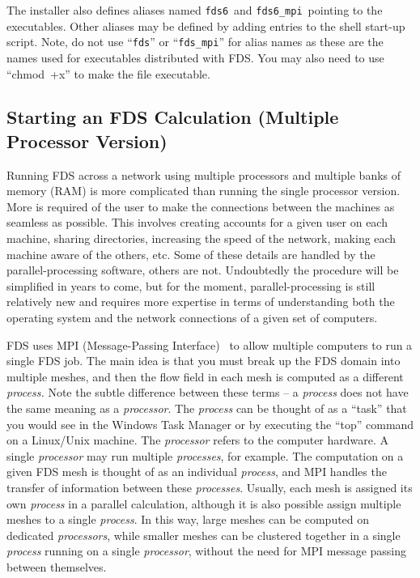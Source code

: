 \documentclass[11pt]{book}
\newcommand{\ct}{\tt\small}
\begin{document}
The installer also defines aliases named {\ct fds6}\ and {\ct fds6\_mpi}\
pointing to the executables. Other aliases may be defined by
adding entries to the shell start-up script. Note, do not use
``{\ct fds}'' or ``{\ct fds\_mpi}'' for alias names as these are
the names used for executables distributed with FDS. You may also
need to use ``chmod~+x'' to make the file executable.


\subsection{Starting an FDS Calculation (Multiple Processor Version)}
\label{info:parallelprocessing}

Running FDS across a network using multiple processors and multiple
banks of memory (RAM) is more complicated than running the single
processor version.  More is required of the user to make the
connections between the machines as seamless as possible. This
involves creating accounts for a given user on each machine, sharing
directories, increasing the speed of the network, making each machine
aware of the others, etc.  Some of these details are handled by
the parallel-processing software, others are not. Undoubtedly the
procedure will be simplified in years to come, but for the moment,
parallel-processing is still relatively new and requires more
expertise in terms of understanding both the operating system and the
network connections of a given set of computers.

FDS uses MPI (Message-Passing Interface)~\cite{Gropp:1} to allow
multiple computers to run a single FDS job. The main idea is that you must break up the FDS domain into multiple meshes, and then
the flow field in each mesh is computed as a different {\em process.}
Note the subtle difference between these
terms -- a {\em process} does not have the same meaning as a {\em processor}.
The {\em process} can be thought of as a ``task'' that you would see in
the Windows Task Manager or by executing the ``top'' command on a Linux/Unix machine. The {\em processor} refers to the
computer hardware. A single
{\em processor} may run multiple {\em processes}, for example.
The computation on a given FDS mesh is thought of as an individual {\em process}, and
MPI handles the transfer of information between these {\em processes}.
Usually, each mesh is assigned its own {\em process} in a parallel calculation,
although it is also possible
assign multiple meshes to a single {\em process}.
In this way, large meshes can be computed on dedicated {\em processors}, while
smaller meshes can be clustered together in a single {\em process} running on a single {\em processor},
without the need for MPI message passing between themselves.
\end{document}
